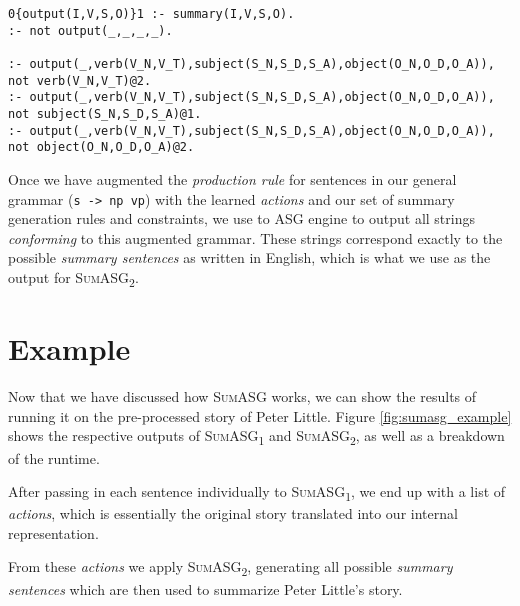 \begin{displayquote}
\begin{lstlisting}
0{output(I,V,S,O)}1 :- summary(I,V,S,O).
:- not output(_,_,_,_).

:- output(_,verb(V_N,V_T),subject(S_N,S_D,S_A),object(O_N,O_D,O_A)), not verb(V_N,V_T)@2.
:- output(_,verb(V_N,V_T),subject(S_N,S_D,S_A),object(O_N,O_D,O_A)), not subject(S_N,S_D,S_A)@1.
:- output(_,verb(V_N,V_T),subject(S_N,S_D,S_A),object(O_N,O_D,O_A)), not object(O_N,O_D,O_A)@2.
\end{lstlisting}
\end{displayquote}

\noindent
Once we have augmented the \textit{production rule} for sentences in our general grammar (\texttt{s -> np vp}) with the learned \textit{actions} and our set of summary generation rules and constraints, we use to ASG engine to output all strings \textit{conforming} to this augmented grammar. These strings correspond exactly to the possible \textit{summary sentences} as written in English, which is what we use as the output for \textsc{SumASG\textsubscript{2}}.

\section{Example}
\label{sec:asg_example}

Now that we have discussed how \textsc{SumASG} works, we can show the results of running it on the pre-processed story of Peter Little. Figure \ref{fig:sumasg_example} shows the respective outputs of \textsc{SumASG\textsubscript{1}} and \textsc{SumASG\textsubscript{2}}, as well as a breakdown of the runtime.

After passing in each sentence individually to \textsc{SumASG\textsubscript{1}}, we end up with a list of \textit{actions}, which is essentially the original story translated into our internal representation.

From these \textit{actions} we apply \textsc{SumASG\textsubscript{2}}, generating all possible \textit{summary sentences} which are then used to summarize Peter Little's story.

